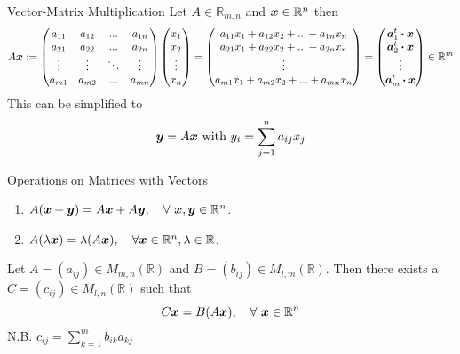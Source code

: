 \documentclass[11pt,a4paper]{article}
\begin{document}
\subtitle{Definition 3.06 - }{Vector-Matrix Multiplication}
Let $A \in \mathbb{R}_{m,n}$ and $\boldsymbol{x} \in \mathbb{R}^n$ then
$$A\boldsymbol{x} := \begin{pmatrix}
  a_{11} & a_{12} & ... & a_{1n} \\
  a_{21} & a_{22} & ... & a_{2n} \\
  \vdots & \vdots & \ddots & \vdots \\
  a_{m1} & a_{m2} & ... & a_{mn}
\end{pmatrix} \begin{pmatrix}
  x_1 \\ x_2 \\ \vdots \\ x_n
\end{pmatrix} = \begin{pmatrix}
  a_{11}x_1 + a_{12}x_2 + ... + a_{1n}{x_n} \\
  a_{21}x_1 + a_{22}x_2 + ... + a_{2n}{x_n} \\
  \vdots \\
  a_{m1}x_1 + a_{m2}x_2 + ... + a_{mn}{x_n} \\
\end{pmatrix} = \begin{pmatrix}
  \boldsymbol{a}_{1}^{t} \boldsymbol{\cdot} \boldsymbol{x} \\
  \boldsymbol{a}_{2}^{t} \boldsymbol{\cdot} \boldsymbol{x} \\
  \vdots \\
  \boldsymbol{a}_{m}^{t} \boldsymbol{\cdot} \boldsymbol{x} \\
\end{pmatrix} \in \mathbb{R}^m
$$ This can be simplified to $$\boldsymbol{y} = A\boldsymbol{x} \mathrm{\ with\ } y_i = \sum_{j=1}^n a_{ij} x_j$$

\subtitle{Theorem 3.07 - }{Operations on Matrices with Vectors}
\begin{enumerate}[label=\roman*)]
  \item $A(\boldsymbol{x} + \boldsymbol{y}) = A\boldsymbol{x} + A\boldsymbol{y},\quad \forall\ \boldsymbol{x}, \boldsymbol{y} \in \mathbb{R}^n$.
  \item $A(\lambda\boldsymbol{x}) = \lambda(A\boldsymbol{x}),\quad \forall \boldsymbol{x} \in \mathbb{R}^n, \lambda \in \mathbb{R}$.
\end{enumerate}

\subtitle{Theorem 3.08}{}
Let $A = (a_{ij}) \in M_{m,n}(\mathbb{R})$ and $B = (b_{ij}) \in M_{l,m}(\mathbb{R})$.
Then there exists a $C = (c_{ij}) \in M_{l,n}(\mathbb{R})$ such that
$$C\boldsymbol{x} = B(A\boldsymbol{x}), \quad \forall\ \boldsymbol{x} \in \mathbb{R}^n$$
\underline{N.B.} $c_{ij} = \sum_{k=1}^m b_{ik} a_{kj}$ \\
\end{document}
